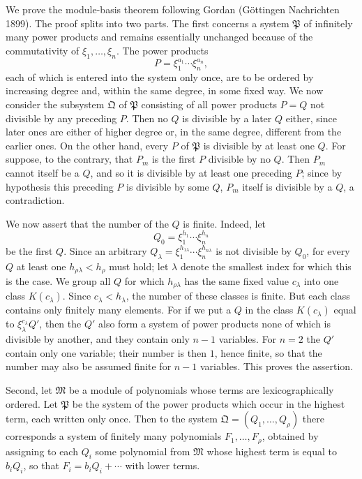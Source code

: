 \documentclass[11pt]{article}
\newcommand{\mM}{\mathfrak{M}}
\providecommand{\mP}{\mathfrak{P}}
\providecommand{\mQ}{\mathfrak{Q}}
\begin{document}
We prove the module-basis theorem following Gordan (Göttingen Nachrichten 1899). The proof splits into two parts. The first concerns a system $\mP$ of infinitely many power products and remains essentially unchanged because of the commutativity of $\xi_1,
\ldots,\xi_n$. The power products
\[
 P=\xi_1^{a_1}\cdots\xi_n^{a_n},
\]
each of which is entered into the system only once, are to be ordered by increasing degree and, within the same degree, in some fixed way. We now consider the subsystem $\mQ$ of $\mP$ consisting of all power products $P=Q$ not divisible by any preceding $P$. Then no $Q$ is divisible by a later $Q$ either, since later ones are either of higher degree or, in the same degree, different from the earlier ones. On the other hand, every $P$ of $\mP$ is divisible by at least one $Q$. For suppose, to the contrary, that $P_m$ is the first $P$ divisible by no $Q$. Then $P_m$ cannot itself be a $Q$, and so it is divisible by at least one preceding $P$; since by hypothesis this preceding $P$ is divisible by some $Q$, $P_m$ itself is divisible by a $Q$, a contradiction.

We now assert that the number of the $Q$ is finite. Indeed, let
\[
 Q_0=\xi_1^{h_1}\cdots\xi_n^{h_n}
\]
be the first $Q$. Since an arbitrary $Q_\lambda=\xi_1^{h_{1\lambda}}\cdots\xi_n^{h_{n\lambda}}$ is not divisible by $Q_0$, for every $Q$ at least one $h_{\rho\lambda}<h_\rho$ must hold; let $\lambda$ denote the smallest index for which this is the case. We group all $Q$ for which $h_{\rho\lambda}$ has the same fixed value $c_\lambda$ into one class $K(c_\lambda)$. Since $c_\lambda<h_\lambda$, the number of these classes is finite. But each class contains only finitely many elements. For if we put a $Q$ in the class $K(c_\lambda)$ equal to $\xi_\lambda^{c_\lambda}Q'$, then the $Q'$ also form a system of power products none of which is divisible by another, and they contain only $n-1$ variables. For $n=2$ the $Q'$ contain only one variable; their number is then $1$, hence finite, so that the number may also be assumed finite for $n-1$ variables. This proves the assertion.

Second, let $\mM$ be a module of polynomials whose terms are lexicographically ordered. Let $\mP$ be the system of the power products which occur in the highest term, each written only once. Then to the system $\mQ=(Q_1,
\ldots,Q_\rho)$ there corresponds a system of finitely many polynomials $F_1,
\ldots,F_\rho$, obtained by assigning to each $Q_i$ some polynomial from $\mM$ whose highest term is equal to $b_iQ_i$, so that $F_i=b_iQ_i+
\cdots$ with lower terms.
\end{document}
